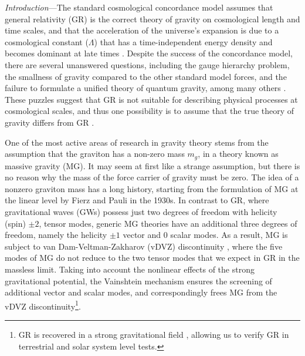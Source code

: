 \documentclass[prd,twocolumn,aps,psfig,nofootinbib,nobibnotes,superscriptaddress,preprintnumbers,times]{revtex4-2}
\begin{document}
\textit{Introduction}---The standard cosmological concordance model assumes that general relativity (GR) is the correct theory of gravity on cosmological length and time scales, and that the acceleration of the universe's expansion is due to a cosmological constant ($\Lambda$) that has a time-independent energy density and becomes dominant at late times \cite{Dodelson:2020bqr}. 
Despite the success of the concordance model, there are several unanswered questions, including the gauge hierarchy problem, the smallness of gravity compared to the other standard model forces, and the failure to formulate a unified theory of quantum gravity, among many others \cite{Dvali:2013qwe, Moffat:1998vi}. 
These puzzles suggest that GR is not suitable for describing physical processes at cosmological scales, and thus one possibility is to assume that the true theory of gravity differs from GR \cite{deRham:2023byw}. 


One of the most active areas of research in gravity theory stems from the assumption that the graviton has a non-zero mass $m_g$, in a theory known as massive gravity (MG). It may seem at first like a strange assumption, but there is no reason why the mass of the force carrier of gravity must be zero. The idea of a nonzero graviton mass has a long history, starting from the formulation of MG at the linear level by Fierz and Pauli \cite{Fierz:1939ix} in the 1930s. In contrast to GR, where gravitational waves (GWs) possess just two degrees of freedom with helicity (spin) $\pm 2$, tensor modes, generic MG theories have an additional three degrees of freedom, namely the helicity  $\pm 1$ vector and $0$ scalar modes. As a result, MG is subject to van Dam-Veltman-Zakharov (vDVZ) discontinuity \cite{vanDam:1970vg,Zakharov:1970cc}, where the five modes of MG do not reduce to the two tensor modes that we expect in GR in the massless limit.
Taking into account the nonlinear effects of the strong gravitational potential, the Vainshtein mechanism \cite{Vainshtein:1972sx} ensures the screening of additional vector and scalar modes, and correspondingly frees MG from the vDVZ discontinuity\footnote{GR is recovered in a strong gravitational field \cite{Tasinato:2013rza}, allowing us to verify GR in terrestrial and solar system level tests.}.
\end{document}
